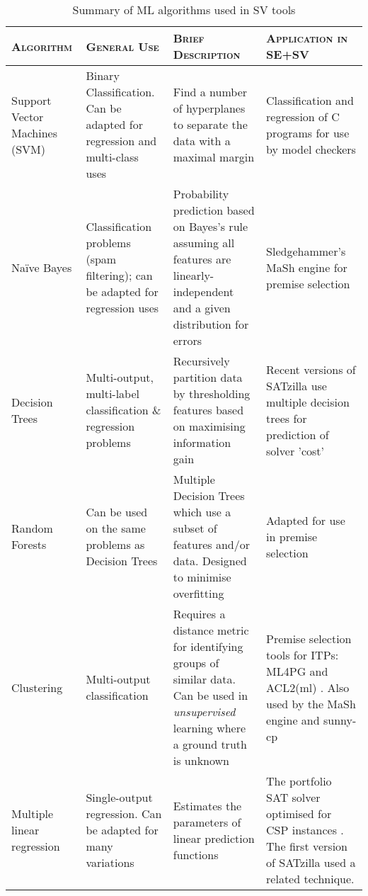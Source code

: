 \begin{table}
	\caption[Summary of ML algorithms used in SV tools]{Summary of ML algorithms used in SV tools}
	\begin{adjustbox}{angle=90}  
		\begin{tabularx}{0.9\textheight}{@{}Y|Y|Y|Y@{}}
			
			\textsc{\textbf{Algorithm}} & \textsc{\textbf{General Use}} &  \textsc{\textbf{Brief Description}} & \textsc{\textbf{Application in SE+SV}} \\
			\midrule
			Support Vector Machines (SVM) & Binary Classification. Can be adapted for regression and multi-class uses & Find a number of hyperplanes to separate the data with a maximal margin & Classification and regression of C programs for use by model checkers \cite{MUX,DPVZ15:CAV} \\ 
			\midrule
			Na{\"i}ve Bayes & Classification problems (spam filtering); can be adapted for regression uses  & Probability prediction based on Bayes's rule assuming all features are linearly-independent and a given distribution for errors & Sledgehammer's MaSh engine for premise selection \cite{Sledgehammer} \\
			\midrule
			Decision Trees & Multi-output, multi-label classification \& regression problems & Recursively partition data by thresholding features based on maximising information gain & Recent versions of SATzilla \cite{SATzilla2012} use multiple decision trees for prediction of solver 'cost' \\
			\midrule
			Random Forests & Can be used on the same problems as Decision Trees & Multiple Decision Trees which use a subset of features and/or data. Designed to minimise overfitting & Adapted for use in premise selection \cite{Farber2015} \\
			\midrule
			Clustering & Multi-output classification & Requires a distance metric for identifying groups of similar data. Can be used in \textit{unsupervised} learning where a ground truth is unknown & Premise selection tools for ITPs: ML4PG \cite{ML4PG} and ACL2(ml) \cite{Heras2013}. Also used by the MaSh engine \cite{Sledgehammer} and sunny-cp \cite{sunny-cp} \\ 
			\midrule
			Multiple linear regression & Single-output regression. Can be adapted for many variations & Estimates the parameters of linear prediction functions & The portfolio SAT solver optimised for CSP instances \cite{Hurley2014}. The first version of SATzilla \cite{Satzilla} used a related technique. \\	
			
		\end{tabularx}
	\end{adjustbox}
	\label{table:algorithms}
\end{table}



